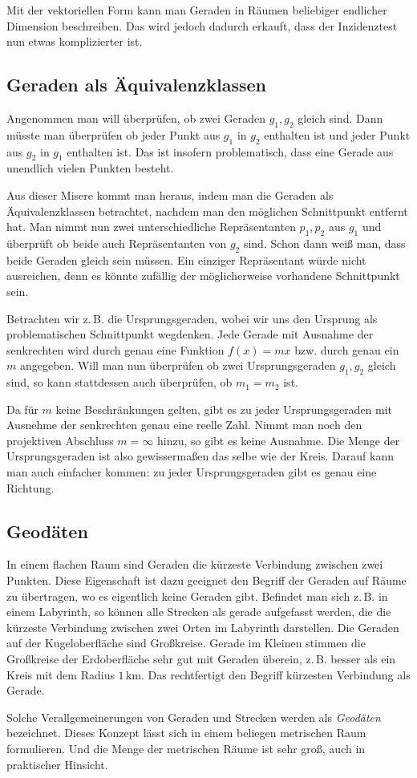 \documentclass[a4paper,11pt,fleqn,twocolumn,twoside,dvipdfmx]{scrartcl}
\begin{document}
Mit der vektoriellen Form kann man Geraden in Räumen beliebiger
endlicher Dimension beschreiben. Das wird jedoch dadurch erkauft,
dass der Inzidenztest nun etwas komplizierter ist.

\subsection{Geraden als Äquivalenzklassen}

Angenommen man will überprüfen, ob zwei Geraden $g_1,g_2$ gleich sind.
Dann müsste man überprüfen ob jeder Punkt aus $g_1$ in $g_2$
enthalten ist und jeder Punkt aus $g_2$ in $g_1$ enthalten ist.
Das ist insofern problematisch, dass eine Gerade aus unendlich vielen
Punkten besteht.

Aus dieser Misere kommt man heraus, indem man die Geraden als
Äquivalenzklassen betrachtet, nachdem man den möglichen Schnittpunkt
entfernt hat. Man nimmt nun zwei unterschiedliche Repräsentanten
$p_1,p_2$ aus $g_1$ und überprüft ob beide auch Repräsentanten
von $g_2$ sind. Schon dann weiß man, dass beide Geraden gleich
sein müssen. Ein einziger Repräsentant würde nicht ausreichen, denn
es könnte zufällig der möglicherweise vorhandene Schnittpunkt sein.

Betrachten wir z.\,B. die Ursprungsgeraden, wobei wir uns den
Ursprung als problematischen Schnittpunkt wegdenken. Jede Gerade
mit Ausnahme der senkrechten wird durch genau eine Funktion
$f(x)=mx$ bzw. durch genau ein $m$ angegeben.
Will man nun überprüfen ob zwei Ursprungsgeraden $g_1,g_2$ gleich
sind, so kann stattdessen auch überprüfen, ob $m_1=m_2$ ist.

Da für $m$ keine Beschränkungen gelten, gibt es zu jeder
Ursprungsgeraden mit Ausnehme der senkrechten genau eine reelle Zahl.
Nimmt man noch den projektiven Abschluss $m=\infty$ hinzu, so
gibt es keine Ausnahme. Die Menge der Ursprungsgeraden ist also
gewissermaßen das selbe wie der Kreis. Darauf kann man auch einfacher
kommen: zu jeder Ursprungsgeraden gibt es genau eine Richtung.


\subsection{Geodäten}

In einem flachen Raum sind Geraden die kürzeste Verbindung zwischen
zwei Punkten. Diese Eigenschaft ist dazu geeignet den Begriff der
Geraden auf Räume zu übertragen, wo es eigentlich keine Geraden
gibt. Befindet man sich z.\,B. in einem Labyrinth, so können alle
Strecken als gerade aufgefasst werden, die die kürzeste Verbindung
zwischen zwei Orten im Labyrinth darstellen. Die Geraden auf der
Kugeloberfläche sind Großkreise. Gerade im Kleinen stimmen die
Großkreise der Erdoberfläche sehr gut mit Geraden überein,
z.\,B. besser als ein Kreis mit dem Radius $1\,\mathrm{km}$.
Das rechtfertigt den Begriff kürzesten Verbindung als Gerade.

Solche Verallgemeinerungen von Geraden und Strecken werden als
\emph{Geodäten} bezeichnet. Dieses Konzept lässt sich in einem
beliegen metrischen Raum formulieren. Und die Menge der metrischen
Räume ist sehr groß, auch in praktischer Hinsicht.
\end{document}
